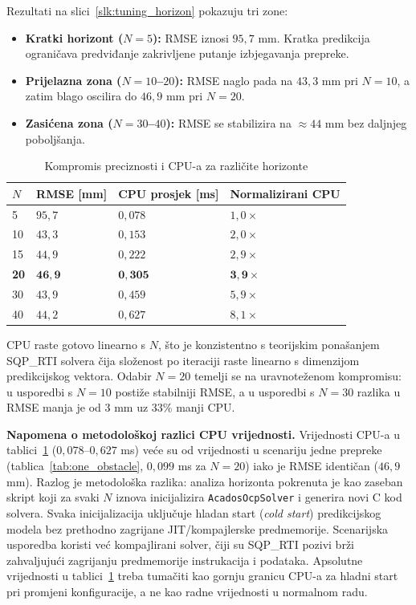Rezultati na slici~\ref{slk:tuning_horizon} pokazuju tri zone:
\begin{itemize}
  \item \textbf{Kratki horizont ($N = 5$):} RMSE iznosi $95{,}7$ mm. Kratka predikcija ograničava predviđanje zakrivljene putanje izbjegavanja prepreke.
  \item \textbf{Prijelazna zona ($N = 10$--$20$):} RMSE naglo pada na $43{,}3$ mm pri $N = 10$, a zatim blago oscilira do $46{,}9$ mm pri $N = 20$.
  \item \textbf{Zasićena zona ($N = 30$--$40$):} RMSE se stabilizira na $\approx 44$ mm bez daljnjeg poboljšanja.
\end{itemize}

\begin{table}[H]
\centering
\caption{Kompromis preciznosti i CPU-a za različite horizonte}
\label{tab:horizon}
\begin{tabular}{llll}
\toprule
$N$ & RMSE [mm] & CPU prosjek [ms] & Normalizirani CPU \\
\midrule
5 & $95{,}7$ & $0{,}078$ & $1{,}0\times$ \\
10 & $43{,}3$ & $0{,}153$ & $2{,}0\times$ \\
15 & $44{,}9$ & $0{,}222$ & $2{,}9\times$ \\
\textbf{20} & $\mathbf{46{,}9}$ & $\mathbf{0{,}305}$ & $\mathbf{3{,}9\times}$ \\
30 & $43{,}9$ & $0{,}459$ & $5{,}9\times$ \\
40 & $44{,}2$ & $0{,}627$ & $8{,}1\times$ \\
\bottomrule
\end{tabular}
\end{table}

CPU raste gotovo linearno s $N$, što je konzistentno s teorijskim ponašanjem SQP\_RTI solvera čija složenost po iteraciji raste linearno s dimenzijom predikcijskog vektora. Odabir $N = 20$ temelji se na uravnoteženom kompromisu: u usporedbi s $N = 10$ postiže stabilniji RMSE, a u usporedbi s $N = 30$ razlika u RMSE manja je od $3$ mm uz $33$\% manji CPU.

\textbf{Napomena o metodološkoj razlici CPU vrijednosti.} Vrijednosti CPU-a u tablici~\ref{tab:horizon} ($0{,}078$--$0{,}627$ ms) veće su od vrijednosti u scenariju jedne prepreke (tablica~\ref{tab:one_obstacle}, $0{,}099$ ms za $N=20$) iako je RMSE identičan ($46{,}9$ mm). Razlog je metodološka razlika: analiza horizonta pokrenuta je kao zaseban skript koji za svaki $N$ iznova inicijalizira \texttt{AcadosOcpSolver} i generira novi C kod solvera. Svaka inicijalizacija uključuje hladan start (\textit{cold start}) predikcijskog modela bez prethodno zagrijane JIT/kompajlerske predmemorije. Scenarijska usporedba koristi već kompajlirani solver, čiji su SQP\_RTI pozivi brži zahvaljujući zagrijanju predmemorije instrukacija i podataka. Apsolutne vrijednosti u tablici~\ref{tab:horizon} treba tumačiti kao gornju granicu CPU-a za hladni start pri promjeni konfiguracije, a ne kao radne vrijednosti u normalnom radu.

